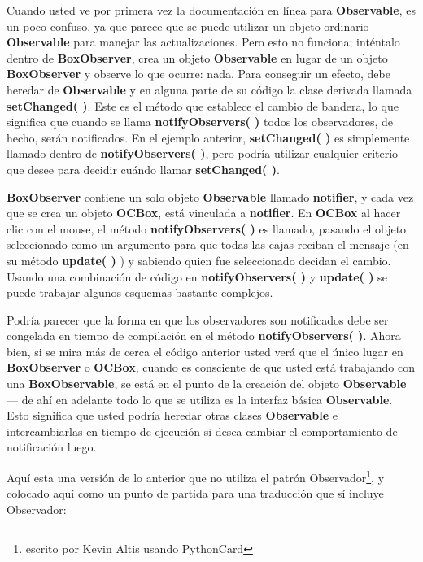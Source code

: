 Cuando usted ve por primera vez la documentación en línea para \textbf{Observable}, es un poco confuso, ya que parece que se puede utilizar un objeto ordinario \textbf{Observable} para manejar las actualizaciones. Pero esto no funciona; inténtalo \- dentro de \textbf{BoxObserver}, crea un objeto \textbf{Observable} en lugar de un objeto \textbf{BoxObserver} y observe lo que ocurre: nada. Para conseguir un efecto, debe heredar de \textbf{Observable} y en alguna parte de su código la clase derivada llamada \textbf{setChanged( )}. Este es el método que establece el cambio de bandera, lo que significa que cuando se llama \textbf{notifyObservers( )} todos los observadores, de hecho, serán notificados. En el ejemplo anterior, \textbf{setChanged( )} es simplemente llamado dentro de \textbf{notifyObservers( )}, pero podría utilizar cualquier criterio que desee para decidir cuándo llamar \textbf{setChanged( )}.      \newline

\textbf{BoxObserver} contiene un solo objeto \textbf{Observable} llamado \textbf{notifier}, y cada vez que se crea un objeto \textbf{OCBox}, está vinculada a \textbf{notifier}.  En \textbf{OCBox} al hacer clic con el mouse, el método \textbf{notifyObservers( )} es llamado, pasando el objeto seleccionado como un argumento para que todas las cajas reciban el mensaje (en su método \textbf{update( ) }) y sabiendo quien fue seleccionado decidan el cambio. Usando una combinación de código en \textbf{notifyObservers( )} y \textbf{update( )} se puede trabajar algunos esquemas bastante complejos.     \newline

Podría parecer que la forma en que los observadores son notificados debe ser congelada en tiempo de compilación en el método \textbf{notifyObservers( )}. Ahora bien, si se mira más de cerca el código anterior usted verá que el único lugar en \textbf{BoxObserver} o \textbf{OCBox}, cuando es consciente de que usted está trabajando con una \textbf{BoxObservable}, se está en el punto de la creación del objeto \textbf{Observable} — de ahí en adelante todo lo que se utiliza es la interfaz básica \textbf{Observable}. Esto significa que usted podría heredar otras clases \textbf{Observable} e intercambiarlas en tiempo de ejecución si desea cambiar el comportamiento de notificación luego.  \newline

Aquí esta una versión de lo anterior que no utiliza el patrón Observador\footnote{escrito por Kevin Altis usando PythonCard}, y colocado aquí como un punto de partida para una traducción que sí incluye Observador:  \newline

